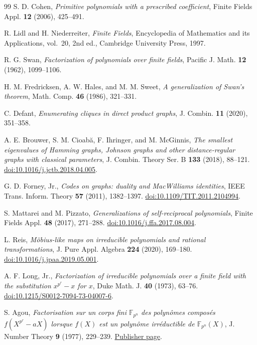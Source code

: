 \documentclass[11pt]{article}
\theoremstyle{definition}
\theoremstyle{remark}
\begin{document}
\begin{thebibliography}{99}
\small
\setlength{\itemsep}{3pt}
S. D. Cohen,
\emph{Primitive polynomials with a prescribed coefficient},
Finite Fields Appl. \textbf{12} (2006), 425--491.

R. Lidl and H. Niederreiter,
\emph{Finite Fields},
Encyclopedia of Mathematics and its Applications, vol.~20, 2nd ed., Cambridge University Press, 1997.

R. G. Swan,
\emph{Factorization of polynomials over finite fields},
Pacific J. Math. \textbf{12} (1962), 1099--1106.

H. M. Fredricksen, A. W. Hales, and M. M. Sweet,
\emph{A generalization of Swan's theorem},
Math. Comp. \textbf{46} (1986), 321--331.

C. Defant,
\emph{Enumerating cliques in direct product graphs},
J. Combin. \textbf{11} (2020), 351--358.

A. E. Brouwer, S. M. Cioab\u{a}, F. Ihringer, and M. McGinnis,
\emph{The smallest eigenvalues of Hamming graphs, Johnson graphs and
other distance-regular graphs with classical parameters},
J. Combin. Theory Ser. B \textbf{133} (2018), 88--121.
\href{https://doi.org/10.1016/j.jctb.2018.04.005}{doi:10.1016/j.jctb.2018.04.005}.

G. D. Forney, Jr.,
\emph{Codes on graphs: duality and MacWilliams identities},
IEEE Trans. Inform. Theory \textbf{57} (2011), 1382--1397.
\href{https://doi.org/10.1109/TIT.2011.2104994}{doi:10.1109/TIT.2011.2104994}.

S. Mattarei and M. Pizzato,
\emph{Generalizations of self-reciprocal polynomials},
Finite Fields Appl. \textbf{48} (2017), 271--288.
\href{https://doi.org/10.1016/j.ffa.2017.08.004}{doi:10.1016/j.ffa.2017.08.004}.

L. Reis,
\emph{M\"obius-like maps on irreducible polynomials and rational transformations},
J. Pure Appl. Algebra \textbf{224} (2020), 169--180.
\href{https://doi.org/10.1016/j.jpaa.2019.05.001}{doi:10.1016/j.jpaa.2019.05.001}.

A. F. Long, Jr.,
\emph{Factorization of irreducible polynomials over a finite field with
the substitution $x^{p^r}-x$ for $x$},
Duke Math. J. \textbf{40} (1973), 63--76.
\href{https://doi.org/10.1215/S0012-7094-73-04007-6}{doi:10.1215/S0012-7094-73-04007-6}.

S. Agou,
\emph{Factorisation sur un corps fini $\mathbb F_{p^n}$ des
polyn\^omes compos\'es $f(X^{p^r}-aX)$ lorsque $f(X)$ est un
polyn\^ome irr\'eductible de $\mathbb F_{p^n}(X)$},
J. Number Theory \textbf{9} (1977), 229--239.
\href{https://www.sciencedirect.com/science/article/pii/0022314X77900270}{Publisher page}.


\end{thebibliography}
\end{document}
